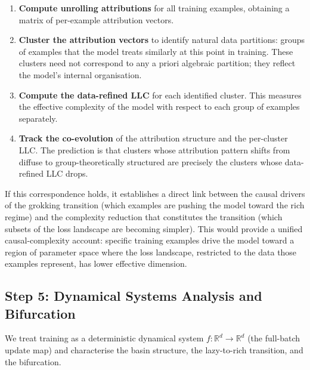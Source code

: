 \documentclass[11pt,a4paper]{article}
\begin{document}
\begin{enumerate}[label=(\roman*)]
    \item \textbf{Compute unrolling attributions} for all training examples, obtaining a matrix of per-example attribution vectors.
    \item \textbf{Cluster the attribution vectors} to identify natural data partitions: groups of examples that the model treats similarly at this point in training. These clusters need not correspond to any a priori algebraic partition; they reflect the model's internal organisation.
    \item \textbf{Compute the data-refined LLC} for each identified cluster. This measures the effective complexity of the model with respect to each group of examples separately.
    \item \textbf{Track the co-evolution} of the attribution structure and the per-cluster LLC. The prediction is that clusters whose attribution pattern shifts from diffuse to group-theoretically structured are precisely the clusters whose data-refined LLC drops.
\end{enumerate}

If this correspondence holds, it establishes a direct link between the causal drivers of the grokking transition (which examples are pushing the model toward the rich regime) and the complexity reduction that constitutes the transition (which subsets of the loss landscape are becoming simpler). This would provide a unified causal-complexity account: specific training examples drive the model toward a region of parameter space where the loss landscape, restricted to the data those examples represent, has lower effective dimension.

\subsection{Step 5: Dynamical Systems Analysis and Bifurcation}\label{sec:dynamics}

We treat training as a deterministic dynamical system $f : \mathbb{R}^d \to \mathbb{R}^d$ (the full-batch update map) and characterise the basin structure, the lazy-to-rich transition, and the bifurcation.
\end{document}
